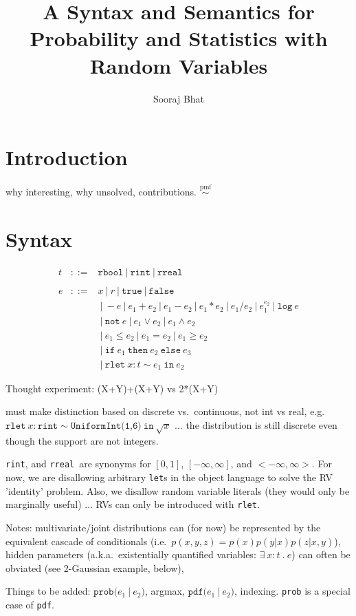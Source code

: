 \documentclass{article}
\title{A Syntax and Semantics for\\Probability and Statistics with Random Variables}
\author{Sooraj Bhat}
\newcommand{\E}[1]{\ensuremath{#1}}
\newcommand{\T}[1]{\texttt{#1}}
\newcommand{\rbool}{\T{rbool}}
\newcommand{\rint}{\T{rint}}
\newcommand{\rreal}{\T{rreal}}
\newcommand{\true}{\T{true}}
\newcommand{\false}{\T{false}}
\newcommand{\rlet}[4]{\E{\T{rlet}\ #1 : #2 \sim #3 \ \T{in}\ #4}}
\newcommand{\pdf}[2]{\E{\T{pdf(} #1 \ | \ #2 \T{)}}}
\newcommand{\prob}[2]{\E{\T{prob(} #1 \ | \ #2 \T{)}}}
\newcommand{\thereis}[3]{\E{\exists\ #1 : #2 \ . \ #3}}
\newcommand{\Not}{\T{not}}
\newcommand{\ite}[3]{\E{\T{if}\ #1\ \T{then}\ #2\ \T{else}\ #3}}
\newcommand{\tildepmf}{\E{\stackrel{\scriptscriptstyle\mathrm{pmf}}{\sim}}}
\begin{document}
\maketitle
\section{Introduction}
%
why interesting, why unsolved, contributions. \tildepmf
%
\section{Syntax}
% 
\begin{eqnarray*}
t & ::= & \rbool \ | \ \rint \ | \ \rreal \\
& & \\
e & ::= & x \ | \ r \ | \ \true \ | \ \false \\
& & \ | \ -e \ | \ e_1 + e_2 \ | \ e_1 - e_2 
    \ | \ e_1 * e_2 \ | \ e_1 / e_2 \ | \ e_1^{e_2} \ | \ \T{log}\ e \\
& & \ | \ \Not\ e \ | \ e_1 \vee e_2 \ | \ e_1 \wedge e_2 \\
& & \ | \ e_1 \leq e_2 \ | \ e_1 = e_2 \ | \ e_1 \geq e_2 \\
& & \ | \ \ite{e_1}{e_2}{e_3} \\
& & \ | \ \rlet{x}{t}{e_1}{e_2} 
\end{eqnarray*}

Thought experiment: (X+Y)+(X+Y) vs 2*(X+Y)

must make distinction based on discrete vs.\ continuous, not int vs real, e.g.
\rlet{x}{\rint}{\T{UniformInt(1,6)}}{\sqrt{x}} ... the distribution is still
discrete even though the support are not integers.

\rint, and \rreal\ are synonyms for $[0,1]$, $[-\infty,\infty]$, and
$<-\infty,\infty>$. For now, we are disallowing arbitrary {\tt let}s
in the object language to solve the RV 'identity' problem.  Also, we
disallow random variable literals (they would only be marginally
useful) ... RVs can only be introduced with \T{rlet}.

Notes: multivariate/joint distributions can (for now) be represented
by the equivalent cascade of conditionals (i.e.\ $p(x,y,z) =
p(x)p(y|x)p(z|x,y)$), hidden parameters (a.k.a.\ existentially
quantified variables: \thereis{x}{t}{e}) can often be obviated (see
2-Gaussian example, below),

Things to be added: \prob{e_1}{e_2}, argmax, \pdf{e_1}{e_2},
indexing. \T{prob} is a special case of \T{pdf}.
\end{document}
